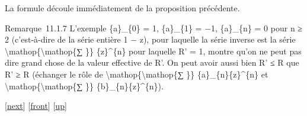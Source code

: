 \documentclass[]{article}
\begin{document}
La formule découle immédiatement de la proposition précédente.

Remarque~11.1.7 L'exemple \{a\}\_\{0\} = 1, \{a\}\_\{1\} = −1,
\{a\}\_\{n\} = 0 pour n ≥ 2 (c'est-à-dire de la série entière 1 − z),
pour laquelle la série inverse est la série
\textbackslash{}mathop\{\textbackslash{}mathop\{∑ \}\} \{z\}\^{}\{n\}
pour laquelle R' = 1, montre qu'on ne peut pas dire grand chose de la
valeur effective de R'. On peut avoir aussi bien R' ≤ R que R' ≥ R
(échanger le rôle de \textbackslash{}mathop\{\textbackslash{}mathop\{∑
\}\} \{a\}\_\{n\}\{z\}\^{}\{n\} et
\textbackslash{}mathop\{\textbackslash{}mathop\{∑ \}\}
\{b\}\_\{n\}\{z\}\^{}\{n\}).

{[}\href{coursse64.html}{next}{]} {[}\href{coursse63.html}{front}{]}
{[}\href{coursch12.html\#coursse63.html}{up}{]}
\end{document}
